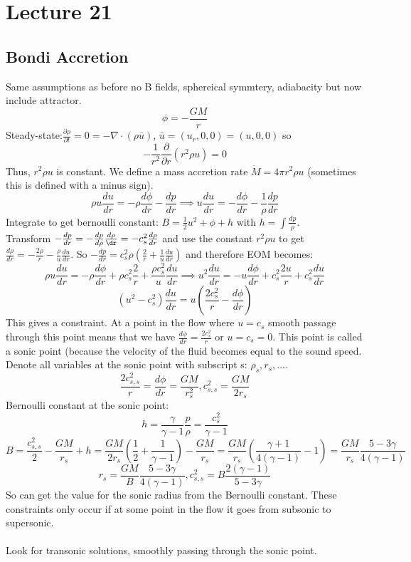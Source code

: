 \documentclass{article}
\begin{document}
\section{Lecture 21}
\subsection{Bondi Accretion}
Same assumptions as before no B fields, sphereical symmtery, adiabacity but now include attractor.
$$\phi = -\frac{GM}{r}$$
Steady-state:$\frac{\partial \rho}{\partial t} = 0= - \nabla \cdot (\rho \bar u)$, $\bar u = (u_r, 0 , 0) = (u, 0, 0)$ so
$$
- \frac{1}{r^2} \frac{\partial}{\partial r}(r^2 \rho u) = 0
$$
Thus, $r^2 \rho u$ is constant. We define a mass accretion rate $\dot M = 4 \pi r^2 \rho u$ (sometimes this is defined with a minus sign). 
$$
\rho u \frac{du}{dr} = - \rho \frac{d \phi}{dr} - \frac{dp}{dr} \implies u\frac{du}{dr} = - \frac{d \phi}{dr} - \frac{1}{\rho} \frac{dp}{dr}
$$
Integrate to get bernoulli constant: $B = \frac{1}{2} u^2 + \phi + h$ with $h = \int \frac{dp}{\rho}$. \\
Transform $-\frac{dp}{dr} = -\frac{dp}{d\rho}\frac{d \rho}{\dr} = - c_s^2 \frac{d \rho}{dr}$ and use the constant $r^2\rho u$ to get $\frac{d\rho}{dr} = -\frac{2\rho}{r} - \frac{\rho}{u} \frac{d u}{dr}$. So $- \frac{dp}{dr} = c^2_s \rho (\frac{2}{r} + \frac{1}{u}\frac{du}{dr})$ and therefore EOM becomes:
$$
\rho u \frac{du}{dr} = - \rho \frac{d\phi}{dr} + \rho c_s^2 \frac{2}{r} + \frac{\rho c_s^2}{u} \frac{du}{dr} \implies u^2 \frac{du}{dr} = - u \frac{d \phi}{dr} + c_s^2 \frac{2u}{r} + c_s^2 \frac{du}{dr}
$$
\begin{equation}
(u^2- c_s^2 ) \frac{du}{dr} = u (\frac{2 c_s^2}{r} - \frac{d\phi}{dr})
\end{equation}
This gives a constraint. At a point in the flow where $u= c_s$ smooth passage through this point means that we have $\frac{d\phi}{dr} = \frac{2c_s^2}{r}$ or $u =c_s  = 0$. This point is called a sonic point (because the velocity of the fluid becomes equal to the sound speed. Denote all variables at the sonic point with subscript s: $\rho_s, r_s,...$.
$$
\frac{2 c_{s,s}^2}{r} = \frac{d \phi}{dr} = \frac{GM}{r_s^2}, c_{s,s}^2 = \frac{GM}{2r_s}
$$
Bernoulli constant at the sonic point:
$$
h = \frac{\gamma}{\gamma -1} \frac{p}{\rho} = \frac{c_s^2}{\gamma -1}
$$
$$
B= \frac{c_{s,s}^2}{2} - \frac{GM}{r_s} + h = \frac{GM}{2r_s} (\frac{1}{2} + \frac{1}{\gamma -1}) - \frac{GM}{r_s} = \frac{GM}{r_s} (\frac{\gamma +1}{4 (\gamma -1)} -1) = \frac{GM}{r_s} \frac{5-3\gamma}{4(\gamma-1)} 
$$
$$
r_s = \frac{GM}{B} \frac{5 -3 \gamma}{4(\gamma -1)}, c_{s,s}^2 = B \frac{2(\gamma -1)}{5-3\gamma}
$$
So can get the value for the sonic radius from the Bernoulli constant. These constraints only occur if at some point in the flow it goes from subsonic to supersonic.\\\\
Look for transonic solutions, smoothly passing through the sonic point.
\end{document}

